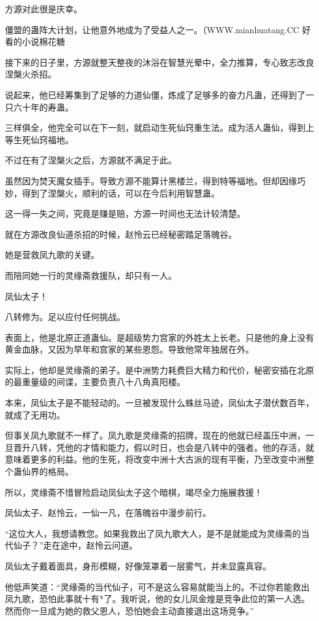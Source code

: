 \begin{this_body}
方源对此很是庆幸。

僵盟的蛊阵大计划，让他意外地成为了受益人之一。（WWW.mianhuatang.CC 好看的小说棉花糖

接下来的日子里，方源就整天整夜的沐浴在智慧光晕中，全力推算，专心致志改良涅槃火杀招。

说起来，他已经筹集到了足够的力道仙僵，炼成了足够多的奋力凡蛊，还得到了一只六十年的寿蛊。

三样俱全，他完全可以在下一刻，就启动生死仙窍重生法。成为活人蛊仙，得到上等生死仙窍福地。

不过在有了涅槃火之后，方源就不满足于此。

虽然因为焚天魔女插手。导致方源不能算计黑楼兰，得到特等福地。但却因缘巧妙，得到了涅槃火，顺利的话，可以在今后利用智慧蛊。

这一得一失之间，究竟是赚是赔，方源一时间也无法计较清楚。

就在方源改良仙道杀招的时候，赵怜云已经秘密踏足落魄谷。

她是营救凤九歌的关键。

而陪同她一行的灵缘斋救援队，却只有一人。

凤仙太子！

八转修为。足以应付任何挑战。

表面上，他是北原正道蛊仙。是超级势力宫家的外姓太上长老。只是他的身上没有黄金血脉，又因为早年和宫家的某些恩怨。导致他常年独居在外。

实际上，他却是灵缘斋的弟子。是中洲势力耗费巨大精力和代价，秘密安插在北原的最重量级的间谍，主要负责八十八角真阳楼。

本来，凤仙太子是不能轻动的。一旦被发现什么蛛丝马迹，凤仙太子潜伏数百年，就成了无用功。

但事关凤九歌就不一样了。凤九歌是灵缘斋的招牌，现在的他就已经盖压中洲，一旦晋升八转，凭他的才情和能力，假以时日，也会是八转中的强者。他的存活，就意味着更多的利益。他的生死，将改变中洲十大古派的现有平衡，乃至改变中洲整个蛊仙界的格局。

所以，灵缘斋不惜冒险启动凤仙太子这个暗棋，竭尽全力施展救援！

凤仙太子、赵怜云，一仙一凡，在落魄谷中漫步前行。

“这位大人，我想请教您。如果我救出了凤九歌大人，是不是就能成为灵缘斋的当代仙子？”走在途中，赵怜云问道。

凤仙太子戴着面具，身形模糊，好像笼罩着一层雾气，并未显露真容。

他低声笑道：“灵缘斋的当代仙子，可不是这么容易就能当上的。不过你若能救出凤九歌，恐怕此事就十有*了。我听说，他的女儿凤金煌是竞争此位的第一人选。然而你一旦成为她的救父恩人，恐怕她会主动直接退出这场竞争。”


\end{this_body}
